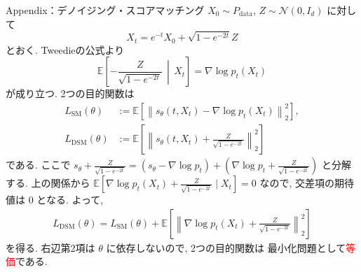 \documentclass[11pt]{beamer}
\newcommand{\E}{\mathbb{E}}
\newcommand{\Pdata}{P_{\text{data}}}
\newcommand{\StdNormal}{\mathcal{N}(0,I_d)}
\begin{document}
\begin{frame}[t]{Appendix：デノイジング・スコアマッチング}
  \footnotesize
  \setlength{\abovedisplayskip}{0.2em}
  \setlength{\belowdisplayskip}{0.2em}
  \setlength{\abovedisplayshortskip}{0.1em}
  \setlength{\belowdisplayshortskip}{0.1em}
  $X_0\sim\Pdata$, $Z\sim\StdNormal$ に対して
  \begin{equation*}
    X_t=e^{-t}X_0+\sqrt{1-e^{-2t}}Z
  \end{equation*}
  とおく. Tweedieの公式より
  \begin{equation*}
    \E\left[-\frac{Z}{\sqrt{1-e^{-2t}}}\,\middle|\,X_t\right]
    =\nabla\log p_t(X_t)
  \end{equation*}
  が成り立つ. 2つの目的関数は
  \begin{align*}
    L_{\mathrm{SM}}(\theta)
    &:=\E\left[
      \left\|s_\theta(t,X_t)-\nabla\log p_t(X_t)\right\|_2^2\right],\\
    L_{\mathrm{DSM}}(\theta)
    &:=\E\left[
      \left\|s_\theta(t,X_t)+\frac{Z}{\sqrt{1-e^{-2t}}}\right\|_2^2\right]
  \end{align*}
  である. ここで
  $s_\theta+\frac{Z}{\sqrt{1-e^{-2t}}}
  =(s_\theta-\nabla\log p_t)
  +(\nabla\log p_t+\frac{Z}{\sqrt{1-e^{-2t}}})$ と分解する.
  上の関係から
  $\E[\nabla\log p_t(X_t)+\frac{Z}{\sqrt{1-e^{-2t}}}\mid X_t]=0$
  なので,
  交差項の期待値は $0$ となる. よって,
  \begin{align*}
    L_{\mathrm{DSM}}(\theta)
    =L_{\mathrm{SM}}(\theta)
    +\E\left[
      \left\|\nabla\log p_t(X_t)
        +\frac{Z}{\sqrt{1-e^{-2t}}}\right\|_2^2\right]
  \end{align*}
  を得る. 右辺第2項は $\theta$ に依存しないので, 2つの目的関数は
  最小化問題として\textcolor{red}{等価}である.
\end{frame}
\end{document}
